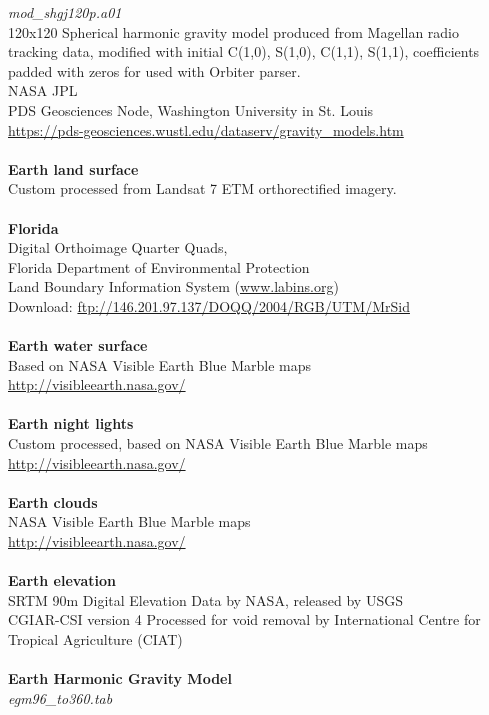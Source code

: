 \documentclass[Orbiter User Manual.tex]{subfiles}
\begin{document}
\textit{mod\_shgj120p.a01}\\
120x120 Spherical harmonic gravity model produced from Magellan radio tracking data, modified with initial C(1,0), S(1,0), C(1,1), S(1,1), coefficients padded with zeros for used with Orbiter parser.\\
NASA JPL\\
PDS Geosciences Node, Washington University in St. Louis\\
\url{https://pds-geosciences.wustl.edu/dataserv/gravity_models.htm}\\
\\
\textbf{Earth land surface}\\
Custom processed from Landsat 7 ETM orthorectified imagery.\\
\\
\textbf{Florida}\\
Digital Orthoimage Quarter Quads,\\
Florida Department of Environmental Protection\\
Land Boundary Information System (\url{www.labins.org})\\
Download: \url{ftp://146.201.97.137/DOQQ/2004/RGB/UTM/MrSid}\\
\\
\textbf{Earth water surface}\\
Based on NASA Visible Earth Blue Marble maps\\
\url{http://visibleearth.nasa.gov/}\\
\\
\textbf{Earth night lights}\\
Custom processed, based on NASA Visible Earth Blue Marble maps\\
\url{http://visibleearth.nasa.gov/}\\
\\
\textbf{Earth clouds}\\
NASA Visible Earth Blue Marble maps\\
\url{http://visibleearth.nasa.gov/}\\
\\
\textbf{Earth elevation}\\
SRTM 90m Digital Elevation Data by NASA, released by USGS\\
CGIAR-CSI version 4 Processed for void removal by International Centre for Tropical Agriculture (CIAT)\\
\\
\textbf{Earth Harmonic Gravity Model}\\
\textit{egm96\_to360.tab}\\
\end{document}
